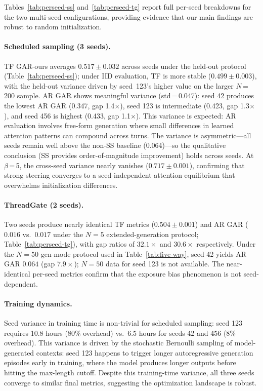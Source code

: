 Tables~\ref{tab:perseed-ss} and~\ref{tab:perseed-tg} report full per-seed breakdowns for the two multi-seed configurations, providing evidence that our main findings are robust to random initialization.

\paragraph{Scheduled sampling (3 seeds).} TF GAR-ours averages $0.517\pm0.032$ across seeds under the held-out protocol (Table~\ref{tab:perseed-ss}); under IID evaluation, TF is more stable ($0.499\pm0.003$), with the held-out variance driven by seed~123's higher value on the larger $N$\,=\,200 sample. AR GAR shows meaningful variance (std\,=\,0.047): seed 42 produces the lowest AR GAR (0.347, gap 1.4$\times$), seed 123 is intermediate (0.423, gap 1.3$\times$), and seed 456 is highest (0.433, gap 1.1$\times$). This variance is expected: AR evaluation involves free-form generation where small differences in learned attention patterns can compound across turns. The variance is asymmetric---all seeds remain well above the non-SS baseline (0.064)---so the qualitative conclusion (SS provides order-of-magnitude improvement) holds across seeds. At $\beta$\,=\,5, the cross-seed variance nearly vanishes ($0.717\pm0.001$), confirming that strong steering converges to a seed-independent attention equilibrium that overwhelms initialization differences.

\paragraph{ThreadGate (2 seeds).} Two seeds produce nearly identical TF metrics ($0.504\pm0.001$) and AR GAR ($0.016$ vs.\ $0.017$ under the $N{=}5$ extended-generation protocol; Table~\ref{tab:perseed-tg}), with gap ratios of $32.1\times$ and $30.6\times$ respectively. Under the $N{=}50$ gen-mode protocol used in Table~\ref{tab:five-way}, seed 42 yields AR GAR $0.064$ (gap $7.9\times$); $N{=}50$ data for seed 123 is not available. The near-identical per-seed metrics confirm that the exposure bias phenomenon is not seed-dependent.

\paragraph{Training dynamics.} Seed variance in training time is non-trivial for scheduled sampling: seed 123 requires 10.8 hours (80\% overhead) vs.\ 6.5 hours for seeds 42 and 456 (8\% overhead). This variance is driven by the stochastic Bernoulli sampling of model-generated contexts: seed 123 happens to trigger longer autoregressive generation episodes early in training, where the model produces longer outputs before hitting the max-length cutoff. Despite this training-time variance, all three seeds converge to similar final metrics, suggesting the optimization landscape is robust.

